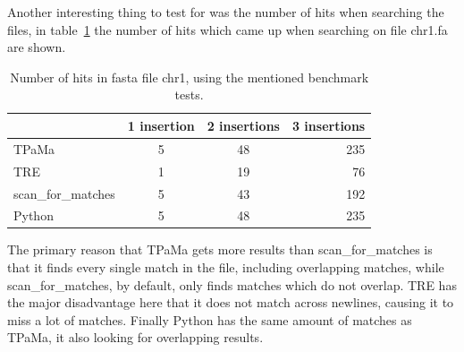 Another interesting thing to test for was the number of hits when searching the files, in table~\ref{tab:hits} the number of hits which came up when searching on file chr1.fa are shown.

\begin{table}[h!]
\centering
\begin{tabular}{ l | c c r }
& 1 insertion & 2 insertions & 3 insertions\\
\hline
TPaMa& 5 &  48 & 235 \\
TRE& 1 & 19 & 76 \\
scan\_for\_matches & 5 & 43  & 192 \\
Python & 5 & 48 & 235
\end{tabular}
\caption{Number of hits in fasta file chr1, using the mentioned benchmark tests.}
\label{tab:hits}
\end{table}

The primary reason that TPaMa gets more results than scan\_for\_matches is that it finds every single match in the file, including overlapping matches, while scan\_for\_matches, by default, only finds matches which do not overlap. TRE has the major disadvantage here that it does not match across newlines, causing it to miss a lot of matches. Finally Python has the same amount of matches as TPaMa, it also looking for overlapping results.